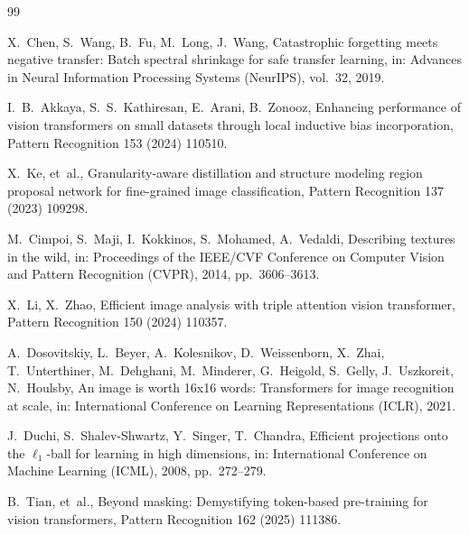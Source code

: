 \documentclass[review,12pt,authoryear]{elsarticle}
\begin{document}
\begin{thebibliography}{99}

X.~Chen, S.~Wang, B.~Fu, M.~Long, J.~Wang,
Catastrophic forgetting meets negative transfer: Batch spectral shrinkage for safe transfer learning,
in: Advances in Neural Information Processing Systems (NeurIPS), vol.~32, 2019.

I.~B.~Akkaya, S.~S.~Kathiresan, E.~Arani, B.~Zonooz,
Enhancing performance of vision transformers on small datasets through local inductive bias incorporation,
Pattern Recognition 153 (2024) 110510.

X.~Ke, et~al.,
Granularity-aware distillation and structure modeling region proposal network for fine-grained image classification,
Pattern Recognition 137 (2023) 109298.

M.~Cimpoi, S.~Maji, I.~Kokkinos, S.~Mohamed, A.~Vedaldi,
Describing textures in the wild,
in: Proceedings of the IEEE/CVF Conference on Computer Vision and Pattern Recognition (CVPR), 2014, pp.~3606--3613.

X.~Li, X.~Zhao,
Efficient image analysis with triple attention vision transformer,
Pattern Recognition 150 (2024) 110357.

A.~Dosovitskiy, L.~Beyer, A.~Kolesnikov, D.~Weissenborn, X.~Zhai, T.~Unterthiner, M.~Dehghani, M.~Minderer, G.~Heigold, S.~Gelly, J.~Uszkoreit, N.~Houlsby,
An image is worth 16x16 words: Transformers for image recognition at scale,
in: International Conference on Learning Representations (ICLR), 2021.

J.~Duchi, S.~Shalev-Shwartz, Y.~Singer, T.~Chandra,
Efficient projections onto the $\ell_1$-ball for learning in high dimensions,
in: International Conference on Machine Learning (ICML), 2008, pp.~272--279.

B.~Tian, et~al.,
Beyond masking: Demystifying token-based pre-training for vision transformers,
Pattern Recognition 162 (2025) 111386.


\end{thebibliography}
\end{document}
